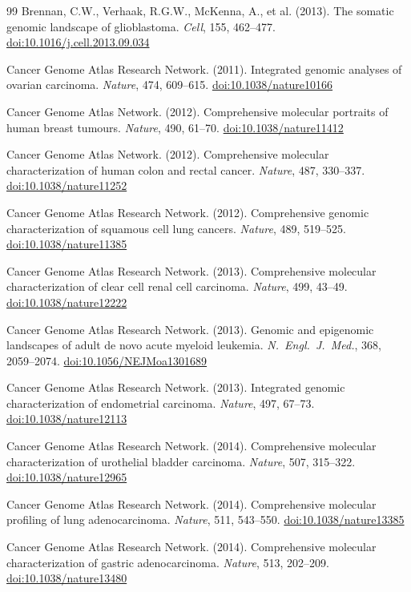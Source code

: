 \documentclass[12pt,a4paper]{article}
\newcommand{\doi}[1]{\href{https://doi.org/#1}{doi:#1}}
\begin{document}
\begin{thebibliography}{99}
Brennan, C.W., Verhaak, R.G.W., McKenna, A., et al. (2013).
The somatic genomic landscape of glioblastoma.
\textit{Cell}, 155, 462--477.
\doi{10.1016/j.cell.2013.09.034}

Cancer Genome Atlas Research Network. (2011).
Integrated genomic analyses of ovarian carcinoma.
\textit{Nature}, 474, 609--615.
\doi{10.1038/nature10166}

Cancer Genome Atlas Network. (2012).
Comprehensive molecular portraits of human breast tumours.
\textit{Nature}, 490, 61--70.
\doi{10.1038/nature11412}

Cancer Genome Atlas Network. (2012).
Comprehensive molecular characterization of human colon and rectal cancer.
\textit{Nature}, 487, 330--337.
\doi{10.1038/nature11252}

Cancer Genome Atlas Research Network. (2012).
Comprehensive genomic characterization of squamous cell lung cancers.
\textit{Nature}, 489, 519--525.
\doi{10.1038/nature11385}

Cancer Genome Atlas Research Network. (2013).
Comprehensive molecular characterization of clear cell renal cell carcinoma.
\textit{Nature}, 499, 43--49.
\doi{10.1038/nature12222}

Cancer Genome Atlas Research Network. (2013).
Genomic and epigenomic landscapes of adult de novo acute myeloid leukemia.
\textit{N.\ Engl.\ J.\ Med.}, 368, 2059--2074.
\doi{10.1056/NEJMoa1301689}

Cancer Genome Atlas Research Network. (2013).
Integrated genomic characterization of endometrial carcinoma.
\textit{Nature}, 497, 67--73.
\doi{10.1038/nature12113}

Cancer Genome Atlas Research Network. (2014).
Comprehensive molecular characterization of urothelial bladder carcinoma.
\textit{Nature}, 507, 315--322.
\doi{10.1038/nature12965}

Cancer Genome Atlas Research Network. (2014).
Comprehensive molecular profiling of lung adenocarcinoma.
\textit{Nature}, 511, 543--550.
\doi{10.1038/nature13385}

Cancer Genome Atlas Research Network. (2014).
Comprehensive molecular characterization of gastric adenocarcinoma.
\textit{Nature}, 513, 202--209.
\doi{10.1038/nature13480}


\end{thebibliography}
\end{document}
